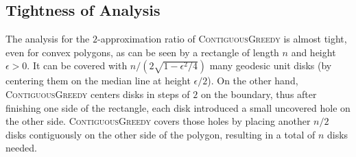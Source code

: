 \documentclass{llncs}
\begin{document}
\subsection{Tightness of Analysis}
The analysis for the $2$-approximation ratio of \textsc{ContiguousGreedy} is almost tight, even for convex polygons, as can be seen by a rectangle of length $n$ and height $\epsilon > 0$. It can be covered with $n/(2\sqrt{1-\epsilon^2/4})$ many geodesic unit disks (by centering them on the median line at height $\epsilon/2$). On the other hand, \textsc{ContiguousGreedy} centers disks in steps of $2$ on the boundary, thus after finishing one side of the rectangle, each disk introduced a small uncovered hole on the other side. \textsc{ContiguousGreedy} covers those holes by placing another $n/2$ disks contiguously on the other side of the polygon, resulting in a total of $n$ disks needed.\\

\vspace{-30pt}
\end{document}
